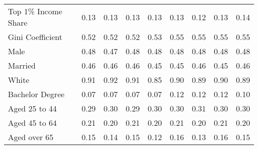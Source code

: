 \documentclass[../Main.tex]{subfiles}
\begin{document}
\begin{table}[htbp]
\begin{tabular}{@{\extracolsep{4pt}}l*{8}{c}}
\multicolumn{1}{l}{Top 1\% Income Share} & \multicolumn{1}{c}{0.13} & \multicolumn{1}{c}{0.13} & \multicolumn{1}{c}{0.13} & \multicolumn{1}{c}{0.13} & \multicolumn{1}{c}{0.13} & \multicolumn{1}{c}{0.12} & \multicolumn{1}{c}{0.13} & \multicolumn{1}{c}{0.14}\\
\multicolumn{1}{l}{Gini Coefficient} & \multicolumn{1}{c}{0.52} & \multicolumn{1}{c}{0.52} & \multicolumn{1}{c}{0.52} & \multicolumn{1}{c}{0.53} & \multicolumn{1}{c}{0.55} & \multicolumn{1}{c}{0.55} & \multicolumn{1}{c}{0.55} & \multicolumn{1}{c}{0.55}\\
\multicolumn{1}{l}{Male} & \multicolumn{1}{c}{0.48} & \multicolumn{1}{c}{0.47} & \multicolumn{1}{c}{0.48} & \multicolumn{1}{c}{0.48} & \multicolumn{1}{c}{0.48} & \multicolumn{1}{c}{0.48} & \multicolumn{1}{c}{0.48} & \multicolumn{1}{c}{0.48}\\
\multicolumn{1}{l}{Married} & \multicolumn{1}{c}{0.46} & \multicolumn{1}{c}{0.46} & \multicolumn{1}{c}{0.46} & \multicolumn{1}{c}{0.45} & \multicolumn{1}{c}{0.45} & \multicolumn{1}{c}{0.46} & \multicolumn{1}{c}{0.45} & \multicolumn{1}{c}{0.46}\\
\multicolumn{1}{l}{White} & \multicolumn{1}{c}{0.91} & \multicolumn{1}{c}{0.92} & \multicolumn{1}{c}{0.91} & \multicolumn{1}{c}{0.85} & \multicolumn{1}{c}{0.90} & \multicolumn{1}{c}{0.89} & \multicolumn{1}{c}{0.90} & \multicolumn{1}{c}{0.89}\\
\multicolumn{1}{l}{Bachelor Degree} & \multicolumn{1}{c}{0.07} & \multicolumn{1}{c}{0.07} & \multicolumn{1}{c}{0.07} & \multicolumn{1}{c}{0.07} & \multicolumn{1}{c}{0.12} & \multicolumn{1}{c}{0.12} & \multicolumn{1}{c}{0.12} & \multicolumn{1}{c}{0.10}\\
\multicolumn{1}{l}{Aged 25 to 44} & \multicolumn{1}{c}{0.29} & \multicolumn{1}{c}{0.30} & \multicolumn{1}{c}{0.29} & \multicolumn{1}{c}{0.30} & \multicolumn{1}{c}{0.30} & \multicolumn{1}{c}{0.31} & \multicolumn{1}{c}{0.30} & \multicolumn{1}{c}{0.30}\\
\multicolumn{1}{l}{Aged 45 to 64} & \multicolumn{1}{c}{0.21} & \multicolumn{1}{c}{0.20} & \multicolumn{1}{c}{0.21} & \multicolumn{1}{c}{0.20} & \multicolumn{1}{c}{0.21} & \multicolumn{1}{c}{0.20} & \multicolumn{1}{c}{0.21} & \multicolumn{1}{c}{0.20}\\
\multicolumn{1}{l}{Aged over 65} & \multicolumn{1}{c}{0.15} & \multicolumn{1}{c}{0.14} & \multicolumn{1}{c}{0.15} & \multicolumn{1}{c}{0.12} & \multicolumn{1}{c}{0.16} & \multicolumn{1}{c}{0.13} & \multicolumn{1}{c}{0.16} & \multicolumn{1}{c}{0.15}\\

\end{tabular}
\end{table}
\end{document}
